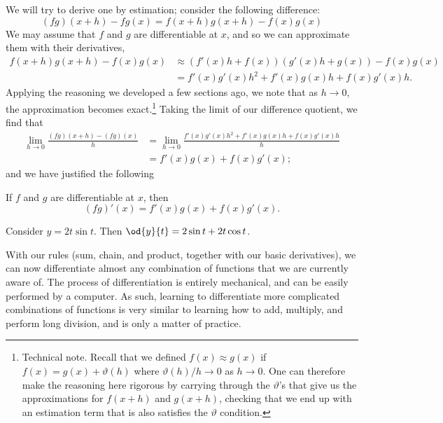 We will try to derive one by estimation; consider the following difference:
\begin{displaymath}
  (fg)(x + h) - fg(x) = f(x + h) g(x + h) - f(x) g(x)
\end{displaymath}
We may assume that $ f $ and $ g $ are differentiable at $ x $, and so we can
approximate them with their derivatives,
\begin{align*}
  f(x + h) g(x + h) - f(x) g(x) &\approx (f'(x)h + f(x))(g'(x)h + g(x)) - f(x) g(x)\\
                                &= f'(x) g'(x) h^2 + f'(x) g(x) h + f(x) g'(x) h.
\end{align*}
Applying the reasoning we developed a few sections ago, we note that as $ h \to 0 $, the
approximation becomes exact.\footnote{Technical note. Recall that we defined $ f(x) \approx g(x) $
if $ f(x) = g(x) + \vartheta(h) $ where $ \vartheta(h)/h \to 0 $ as $ h \to 0 $. One can
therefore make the reasoning here rigorous by carrying through the $ \vartheta$'s that
give us the approximations for $ f(x + h) $ and $ g(x + h) $, checking that we end up with
an estimation term that is also satisfies the $ \vartheta $ condition.} Taking the limit
of our difference quotient, we find that
\begin{align*}
  \lim_{h \to 0} \frac{(fg)(x + h) - (fg)(x)}{h} &= \lim_{h \to 0} \frac{f'(x) g'(x) h^2 + f'(x) g(x) h + f(x) g'(x) h}{h}\\
                                                 &= f'(x) g(x) + f(x) g'(x);
\end{align*}
and we have justified the following
\begin{thm}
  If $ f $ and $ g $ are differentiable at $ x $, then
  \begin{displaymath}
    (fg)'(x) = f'(x) g(x) + f(x) g'(x).
  \end{displaymath}
\end{thm}

\begin{ex}
  Consider $ y = 2t \sin t $. Then $ \od{y}{t} = 2 \sin t + 2t \cos t $.
\end{ex}

With our rules (sum, chain, and product, together with our basic derivatives), we can now differentiate almost any
combination of functions that we are currently aware of. The process of differentiation is entirely mechanical, and
can be easily performed by a computer. As such, learning to differentiate more complicated combinations of functions
is very similar to learning how to add, multiply, and perform long division, and is only a matter of practice.

